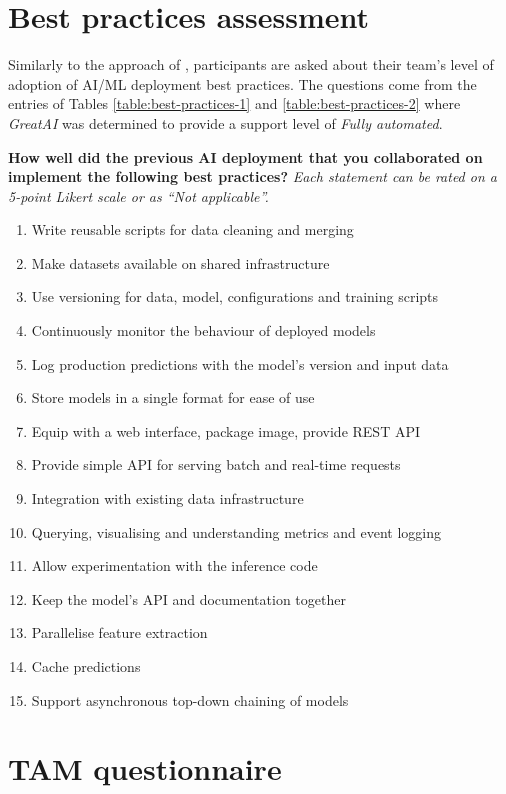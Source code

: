 \appendix

\chapter{Best practices assessment} \label{appendix:practices}

Similarly to the approach of \cite{serban2020adoption}, participants are asked about their team's level of adoption of AI/ML deployment best practices. The questions come from the entries of Tables \ref{table:best-practices-1} and \ref{table:best-practices-2} where \textit{GreatAI} was determined to provide a support level of \textit{Fully automated}.

\textbf{How well did the previous AI deployment that you collaborated on implement the following best practices?} \textit{Each statement can be rated on a 5-point Likert scale or as ``Not applicable''.}

\begin{enumerate}
\item Write reusable scripts for data cleaning and merging
\item Make datasets available on shared infrastructure
\item Use versioning for data, model, configurations and training scripts
\item Continuously monitor the behaviour of deployed models
\item Log production predictions with the model's version and input data
\item Store models in a single format for ease of use
\item Equip with a web interface, package image, provide REST API
\item Provide simple API for serving batch and real-time requests
\item Integration with existing data infrastructure
\item Querying, visualising and understanding metrics and event logging
\item Allow experimentation with the inference code
\item Keep the model's API and documentation together
\item Parallelise feature extraction
\item Cache predictions
\item Support asynchronous top-down chaining of models
\end{enumerate}

\chapter{TAM questionnaire} \label{appendix:questions}

